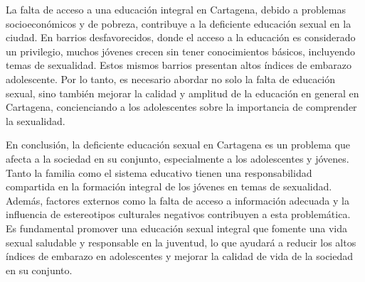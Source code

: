\documentclass[letterpaper, 12pt]{article}
\begin{document}
La falta de acceso a una educación integral en Cartagena,
debido a problemas socioeconómicos y de pobreza, contribuye
a la deficiente educación sexual en la ciudad. En barrios
desfavorecidos, donde el acceso a la educación es
considerado un privilegio, muchos jóvenes crecen sin tener
conocimientos básicos, incluyendo temas de sexualidad.
Estos mismos barrios presentan altos índices de embarazo
adolescente. Por lo tanto, es necesario abordar no solo la
falta de educación sexual, sino también mejorar la calidad
y amplitud de la educación en general en Cartagena,
concienciando a los adolescentes sobre la importancia de
comprender la sexualidad.


En conclusión, la deficiente educación sexual en Cartagena
es un problema que afecta a la sociedad en su conjunto,
especialmente a los adolescentes y jóvenes. Tanto la
familia como el sistema educativo tienen una
responsabilidad compartida en la formación integral de los
jóvenes en temas de sexualidad. Además, factores externos
como la falta de acceso a información adecuada y la
influencia de estereotipos culturales negativos contribuyen
a esta problemática. Es fundamental promover una educación
sexual integral que fomente una vida sexual saludable y
responsable en la juventud, lo que ayudará a reducir los
altos índices de embarazo en adolescentes y mejorar la
calidad de vida de la sociedad en su conjunto.

\newpage

\printbibliography
\end{document}
